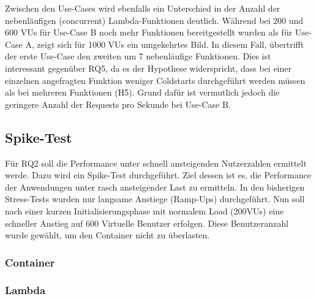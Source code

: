Zwischen den Use-Cases wird ebenfalls ein Unterschied in der Anzahl der nebenläufigen (concurrent) Lambda-Funktionen deutlich. Während bei 200 und 600 VUs für Use-Case B noch mehr Funktionen bereitgestellt wurden als für Use-Case A, zeigt sich für 1000 VUs ein umgekehrtes Bild. In diesem Fall, übertrifft der erste Use-Case den zweiten um 7 nebenläufige Funktionen. Dies ist interessant gegenüber RQ5, da es der Hypothese widerspricht, dass bei einer einzelnen angefragten Funktion weniger Coldstarts durchgeführt werden müssen als bei mehreren Funktionen (H5). Grund dafür ist vermutlich jedoch die geringere Anzahl der Requests pro Sekunde bei Use-Case B. 

\subsection{Spike-Test}
Für RQ2 soll die Performance unter schnell ansteigenden Nutzerzahlen ermittelt werde. Dazu wird ein Spike-Test durchgeführt. Ziel dessen ist es, die Performance der Anwendungen unter rasch ansteigender Last zu ermitteln. In den bisherigen Stress-Tests wurden nur langsame Anstiege (Ramp-Ups) durchgeführt. Nun soll nach einer kurzen Initialisierungsphase mit normalem Load (200VUs) eine schneller Anstieg auf 600 Virtuelle Benutzer erfolgen. Diese Benutzeranzahl wurde gewählt, um den Container nicht zu überlasten.

\subsubsection{Container}


\subsubsection{Lambda}